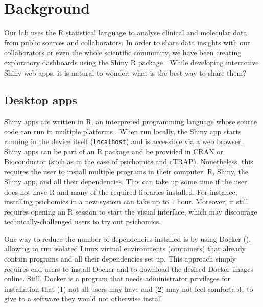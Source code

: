 
\section{Background}

Our lab uses the R statistical language to analyse clinical and molecular data from public sources and collaborators. In order to share data insights with our collaborators or even the whole scientific community, we have been creating exploratory dashboards using the Shiny R package \cite{chang:2021ul}. While developing interactive Shiny web apps, it is natural to wonder: what is the best way to share them?

\subsection{Desktop apps}

Shiny apps are written in R, an interpreted programming language whose source code can run in multiple platforms \cite{r-core-team:2021wf,chang:2021ul}. When run locally, the Shiny app starts running in the device itself (\texttt{localhost}) and is accessible via a web browser. Shiny apps can be part of an R package and be provided in CRAN or Bioconductor (such as in the case of psichomics and cTRAP). Nonetheless, this requires the user to install multiple programs in their computer: R, Shiny, the Shiny app, and all their dependencies. This can take up some time if the user does not have R and many of the required libraries installed. For instance, installing psichomics in a new system can take up to 1 hour. Moreover, it still requires opening an R session to start the visual interface, which may discourage technically-challenged users to try out psichomics.


One way to reduce the number of dependencies installed is by using Docker (), allowing to run isolated Linux virtual environments (containers) that already contain programs and all their dependencies set up. This approach simply requires end-users to install Docker and to download the desired Docker images online. Still, Docker is a program that needs administrator privileges for installation that (1) not all users may have and (2) may not feel comfortable to give to a software they would not otherwise install.

